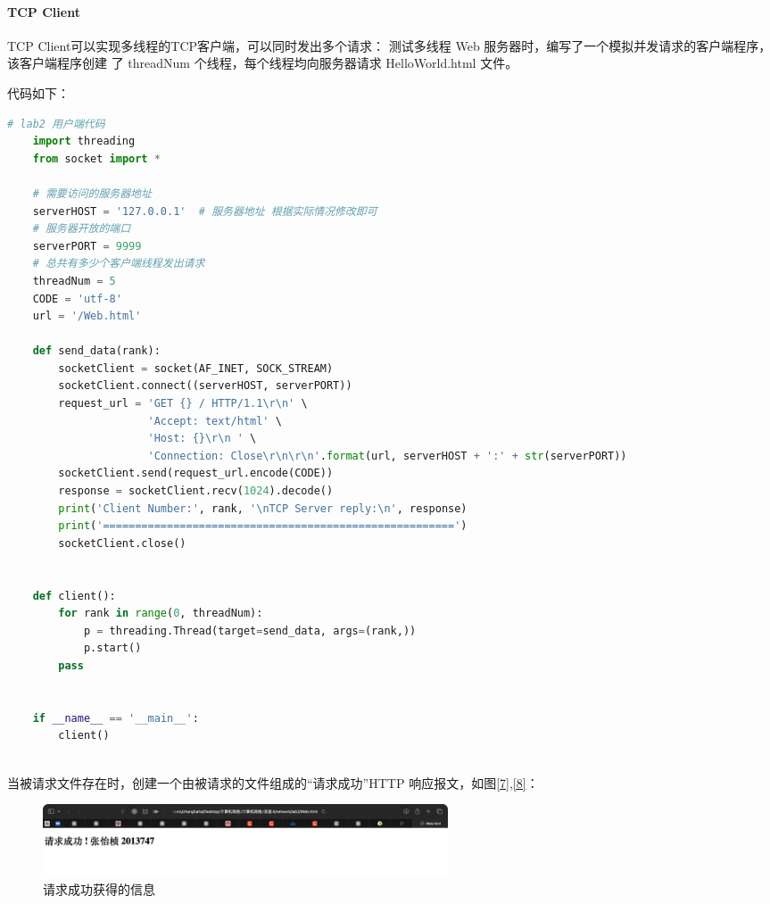 \documentclass[a4paper,12pt]{report}
\begin{document}
\begin{spacing}{1.5}
\begin{spacing}{1}
\begin{lstlisting}[language={Python}]
		\end{lstlisting}
\end{spacing}

\paragraph*{TCP Client}
TCP Client可以实现多线程的TCP客户端，可以同时发出多个请求：
测试多线程 Web 服务器时，编写了一个模拟并发请求的客户端程序，该客户端程序创建 了 threadNum 个线程，每个线程均向服务器请求 HelloWorld.html 文件。

代码如下：
\begin{spacing}{1}  
	\begin{lstlisting}[language={Python}]
    # lab2 用户端代码
    import threading
    from socket import *
    
    # 需要访问的服务器地址
    serverHOST = '127.0.0.1'  # 服务器地址 根据实际情况修改即可
    # 服务器开放的端口
    serverPORT = 9999
    # 总共有多少个客户端线程发出请求
    threadNum = 5
    CODE = 'utf-8'
    url = '/Web.html'
    
    def send_data(rank):
        socketClient = socket(AF_INET, SOCK_STREAM)
        socketClient.connect((serverHOST, serverPORT))
        request_url = 'GET {} / HTTP/1.1\r\n' \
                      'Accept: text/html' \
                      'Host: {}\r\n ' \
                      'Connection: Close\r\n\r\n'.format(url, serverHOST + ':' + str(serverPORT))
        socketClient.send(request_url.encode(CODE))
        response = socketClient.recv(1024).decode()
        print('Client Number:', rank, '\nTCP Server reply:\n', response)
        print('=======================================================')
        socketClient.close()
    
    
    def client():
        for rank in range(0, threadNum):
            p = threading.Thread(target=send_data, args=(rank,))
            p.start()
        pass
    
    
    if __name__ == '__main__':
        client()
    
		\end{lstlisting}
\end{spacing}

当被请求文件存在时，创建一个由被请求的文件组成的“请求成功”HTTP 响应报文，如图\ref{7},\ref{8}：
\begin{figure}[H]
  \centering
\includegraphics[width=12cm]{figure/web.png}
\caption{请求成功获得的信息}
\label{web}
\end{figure}


\end{spacing}
\end{document}
